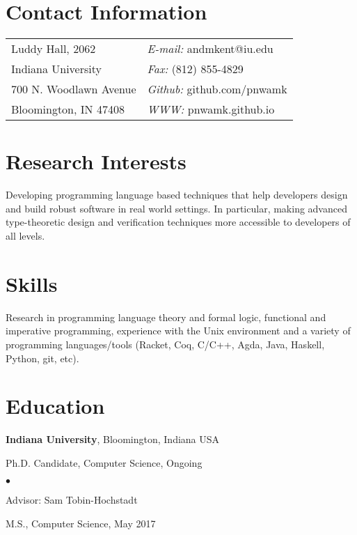 \documentclass[margin,line]{res}
\newenvironment{list1}{
  \begin{list}{\ding{113}}{%
      \setlength{\itemsep}{0in}
      \setlength{\parsep}{0in} \setlength{\parskip}{0in}
      \setlength{\topsep}{0in} \setlength{\partopsep}{0in} 
      \setlength{\leftmargin}{0.17in}}}{\end{list}}
\newenvironment{list2}{
  \begin{list}{$\bullet$}{%
      \setlength{\itemsep}{0in}
      \setlength{\parsep}{0in} \setlength{\parskip}{0in}
      \setlength{\topsep}{0in} \setlength{\partopsep}{0in} 
      \setlength{\leftmargin}{0.2in}}}{\end{list}}
\begin{document}

\begin{resume}
\section{\sc Contact Information}
\vspace{.05in}
\begin{tabular}{@{}p{2in}p{4in}}
Luddy Hall, 2062           & {\it E-mail:} andmkent@iu.edu \\
Indiana University         & {\it Fax:}  (812) 855-4829 \\
700 N. Woodlawn Avenue       & {\it Github:} github.com/pnwamk  \\       
Bloomington, IN 47408      & {\it WWW:} pnwamk.github.io \\     
\end{tabular}


\section{\sc Research Interests}
Developing programming language based techniques that help developers design and
build robust software in real world settings. In particular, making advanced
type-theoretic design and verification techniques more accessible to developers
of all levels.

\section{\sc Skills}
Research in programming language theory and formal logic, functional
and imperative programming, experience with the Unix environment and a
variety of programming languages/tools (Racket, Coq, C/C++, Agda,
Java, Haskell, Python, git, etc).

\section{\sc Education}
{\bf Indiana University}, Bloomington, Indiana USA\\
\vspace*{-.1in}
\begin{list1}
\item[] Ph.D. Candidate, Computer Science, Ongoing
\begin{list2}
\item[] Advisor:  Sam Tobin-Hochstadt
\end{list2}
\vspace*{.05in}
\item[] M.S., Computer Science,  May 2017
\end{list1}


\end{resume}
\end{document}
